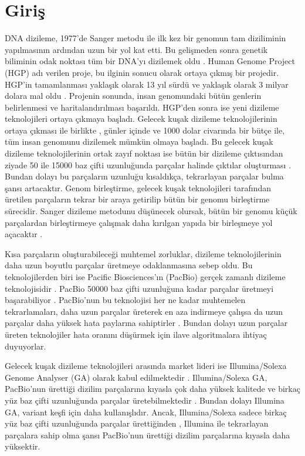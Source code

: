 \section{Giriş}

DNA dizileme, 1977'de Sanger metodu \cite{Sanger1977} ile ilk kez bir genomun tam diziliminin yapılmasının ardından uzun bir yol kat etti. Bu gelişmeden sonra genetik biliminin odak noktası tüm bir DNA'yı dizilemek oldu \cite{Kircher2010}. Human Genome Project (HGP) adı verilen proje, bu ilginin sonucu olarak ortaya çıkmış bir projedir. HGP'in tamamlanması yaklaşık olarak 13 yıl sürdü ve yaklaşık olarak 3 milyar dolara mal oldu \cite{genomep}. Projenin sonunda, insan genomundaki bütün genlerin belirlenmesi ve haritalandırılması başarıldı. HGP'den sonra ise yeni dizileme teknolojileri ortaya çıkmaya başladı. Gelecek kuşak dizileme teknolojilerinin ortaya çıkması ile birlikte \cite{Bentley2008, Clarke2009, Harris2008, Margulies2005, Shendure2005, Korlach2008},  günler içinde ve 1000 dolar civarında bir bütçe ile, tüm insan genomunu dizilemek mümkün olmaya başladı\cite{markoff}. Bu gelecek kuşak dizileme teknolojilerinin ortak zayıf noktası ise bütün bir dizileme çıktısından ziyade 50 ile 15000 baz çifti uzunluğunda parçalar halinde çıktılar oluşturması \cite{Mardis2008a}. Bundan dolayı bu parçaların uzunluğu kısaldıkça, tekrarlayan parçalar bulma şansı artacaktır. Genom birleştirme, gelecek kuşak teknolojileri tarafından üretilen parçaların tekrar bir araya getirilip bütün bir genomu birleştirme sürecidir. Sanger dizileme metodunu düşünecek olursak, bütün bir genomu küçük parçalardan birleştirmeye çalışmak daha kırılgan yapıda bir birleşmeye yol açacaktır \cite{Schatz2010}.

Kısa parçaların oluşturabileceği muhtemel zorluklar, dizileme teknolojilerinin daha uzun boyutlu parçalar üretmeye odaklanmasına sebep oldu. Bu teknolojilerden biri ise Pacific Biosciences'ın (PacBio) gerçek zamanlı dizileme teknolojisidir \cite{Eid2009}. PacBio 50000 baz çifti uzunluğuna kadar parçalar üretmeyi başarabiliyor \cite{Lee2014}. PacBio'nun bu teknolojisi her ne kadar muhtemelen tekrarlamaları, daha uzun parçalar üreterek en aza indirmeye çalışsa da uzun parçalar daha yüksek hata paylarına sahiptirler \cite{Ono2013}. Bundan dolayı uzun parçalar üreten teknolojiler hata oranını düşürmek için ilave algoritmalara ihtiyaç duyuyorlar.

Gelecek kuşak dizileme teknolojileri arasında market lideri ise Illumina/Solexa Genome Analyser (GA) olarak kabul edilmektedir \cite{Metzker2010}. Illumina/Solexa GA, PacBio'nun ürettiği dizilim parçalarına kıyasla çok daha yüksek kalitede ve birkaç yüz baz çifti uzunluğunda parçalar üretebilmektedir \cite{Metzker2010}. Bundan dolayı Illumina GA, variant keşfi için daha kullanışlıdır. Ancak, Illumina/Solexa sadece birkaç yüz baz çifti uzunluğunda parçalar ürettiğinden \cite{Shendure2008}, Illumina ile tekrarlayan parçalara sahip olma şansı PacBio'nun ürettiği dizilim parçalarına kıyasla daha yüksektir.


